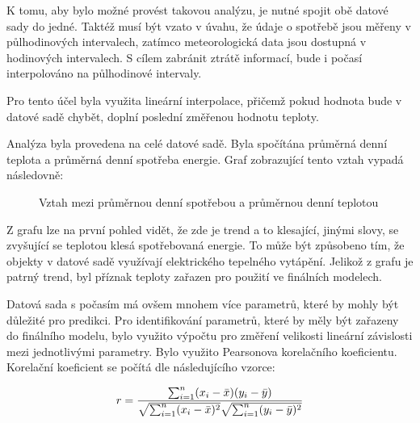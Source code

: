 \documentclass[FM,BP,fonts]{tulthesis}
\begin{document}
K tomu, aby bylo možné provést takovou analýzu, je nutné spojit obě datové sady do jedné. Taktéž musí být vzato v úvahu, že údaje o spotřebě jsou měřeny v půlhodinových intervalech, zatímco meteorologická data jsou dostupná v hodinových intervalech. S cílem zabránit ztrátě informací, bude i počasí interpolováno na půlhodinové intervaly.

Pro tento účel byla využita lineární interpolace, přičemž pokud hodnota bude v datové sadě chybět, doplní poslední změřenou hodnotu teploty.

Analýza byla provedena na celé datové sadě. Byla spočítána průměrná denní teplota a průměrná denní spotřeba energie. Graf zobrazující tento vztah vypadá následovně:

\begin{figure}[htbp]
	\centering
	\caption{Vztah mezi průměrnou denní spotřebou a průměrnou denní teplotou}
	\label{fig:year_avg_all}
\end{figure}

Z grafu lze na první pohled vidět, že zde je trend a to klesající, jinými slovy, se zvyšující se teplotou klesá spotřebovaná energie. To může být způsobeno tím, že objekty v datové sadě využívají elektrického tepelného vytápění. Jelikož z grafu je patrný trend, byl příznak teploty zařazen pro použití ve finálních modelech.

Datová sada s počasím má ovšem mnohem více parametrů, které by mohly být důležité pro predikci. Pro identifikování parametrů, které by měly být zařazeny do finálního modelu, bylo využito výpočtu pro změření velikosti lineární závislosti mezi jednotlivými parametry. Bylo využito Pearsonova korelačního koeficientu. Korelační koeficient se počítá dle následujícího vzorce: 

\begin{equation}
	r =
	\frac{ \sum_{i=1}^{n}(x_i-\bar{x})(y_i-\bar{y}) }{%
		\sqrt{\sum_{i=1}^{n}(x_i-\bar{x})^2}\sqrt{\sum_{i=1}^{n}(y_i-\bar{y})^2}}
\end{equation}
\end{document}
